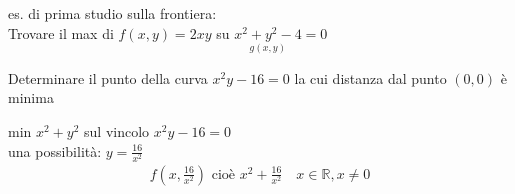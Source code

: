 \documentclass[a4paper, oneside]{article}
\begin{document}
        \begin{example}
            es. di prima studio sulla frontiera:\\
            Trovare il max di $f(x,y) = 2xy$ su $\underset{g(x,y)}{x^2+y^2 -4} = 0$ 
        \end{example}
        \begin{example}
            Determinare il punto della curva $x^2y -16 = 0$ la cui distanza dal punto $(0,0)$ è minima
            \begin{center}
            \end{center}
            min $x^2+y^2$ sul vincolo $x^2y -16= 0$\\
            una possibilità: $y = \frac{16}{x^2}$
            \begin{gather*}
                f(x,\frac{16}{x^2}) \text{ cioè } x^2+\frac{16}{x^2} \quad x \in \mathbb{R}, x \neq 0
            \end{gather*}
        \end{example}
\end{document}
